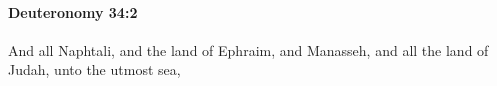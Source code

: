 
		\paragraph{Deuteronomy 34:2} %
			\label{DEUTERONOMY-34-2}

			And all Naphtali, and the land of Ephraim, and Manasseh, and all the land of Judah, unto the utmost sea,


